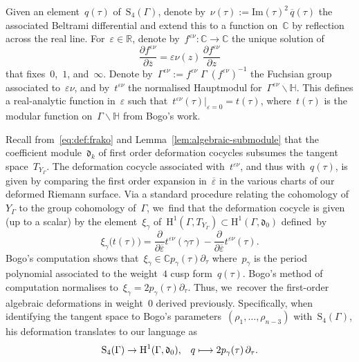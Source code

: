 \documentclass[JEP,XML,SOM,Unicode,published]{cedram}
\newcommand\mto{\mathchoice{\longmapsto}{\mapsto}{\mapsto}{\mapsto}}
\theoremstyle{plain}
\theoremstyle{definition}
\newcommand{\tx}{\text}
\newcommand{\bbC}{\ensuremath{\mathbb{C}}}
\newcommand{\bbR}{\ensuremath{\mathbb{R}}}
\newcommand{\frakd}{\ensuremath{\mathfrak{d}}}
\newcommand{\rmH}{\ensuremath{\mathrm{H}}}
\newcommand{\rmS}{\ensuremath{\mathrm{S}}}
\let\ov\overline
\newcommand{\defeq}{:=}
\renewcommand{\Im}{\mathrm{Im}}
\newcommand{\HS}{\ensuremath{\mathbb{H}}}
\let\Ga\Gamma
\let\ga\gamma
\begin{document}
Given an element~$q(\tau)$ of~$\rmS_4(\Ga)$, denote by~$\nu(\tau) \defeq \Im(\tau)^2\, \ov{q}(\tau)$ the associated Bel\-trami differential and extend this to a function on~$\bbC$ by reflection across the real line. For~$\varepsilon \in \bbR$, denote by~$f^{\varepsilon\nu} : \bbC \to \bbC$ the unique solution of
\begin{equation*}
\frac{\partial f^{\varepsilon\nu}}{\partial\ov{z}}
=
\varepsilon\nu(z)\, \frac{\partial f^{\varepsilon\nu}}{\partial z}
\end{equation*}
that fixes~$0$,~$1$, and~$\infty$. Denote by~$\Ga^{\varepsilon\nu} \defeq f^{\varepsilon\nu}\; \Ga\; (f^{\varepsilon\nu})^{-1}$ the Fuchsian group associated to~$\varepsilon\nu$, and by~$t^{\varepsilon\nu}$ the normalised Hauptmodul for~$\Ga^{\varepsilon\nu} \backslash \HS$. This defines a real-analytic function in~$\varepsilon$ such that~$t^{\varepsilon\nu}(\tau)|_{\varepsilon=0} = t(\tau)$, where~$t(\tau)$ is the modular function on~$\Ga \backslash \HS$ from Bogo's work.

Recall from~\eqref{eq:def:frako} and Lemma~\ref{lem:algebraic-submodule} that the coefficient module~$\frakd_k$ of first order deformation cocycles subsumes the tangent space~$T_{Y_\Ga}$. The deformation cocycle associated with~$t^{\varepsilon\nu}$, and thus with~$q(\tau)$, is given by comparing the first order expansion in~$\ov{\varepsilon}$ in the various charts of our deformed Riemann surface. Via a standard procedure relating the cohomology of~$Y_\Ga$ to the group cohomology of~$\Ga$, we~find that the deformation cocycle is given (up to a scalar) by the element~$\xi_\ga$ of~$\rmH^1(\Ga,T_{Y_\Ga}) \!\subset\! \rmH^1(\Ga, \frakd_0)$ defined~by
\begin{equation*}
\xi_\ga\bigl(t(\tau)\bigr)
=
\frac{\partial}{\partial \ov{\varepsilon}} t^{\varepsilon\nu}(\ga\tau)
- \frac{\partial}{\partial \ov{\varepsilon}} t^{\varepsilon\nu}(\tau)
\tx{.}
\end{equation*}
Bogo's computation shows that~$\xi_\ga \in \bbC p_\gamma(\tau)\partial_\tau$ where~$p_\gamma$ is the period polynomial associated to the weight~$4$ cusp form~$q(\tau)$. Bogo's method of computation normalises to~$\xi_\ga = 2 p_\ga(\tau) \partial_\tau$. Thus, we~recover the first-order algebraic deformations in weight~$0$ derived previously. Specifically, when identifying the tangent space to Bogo's parameters~$(\rho_1, \ldots, \rho_{n-3})$ with~$\rmS_4(\Ga)$, his deformation translates to our language as
\begin{equation*}
\rmS_4(\Ga)
\to
\rmH^1(\Ga, \frakd_0)
\tx{,}\quad
q
\mto
2 p_\ga(\tau)\, \partial_\tau
\tx{.}
\end{equation*}
\end{document}
